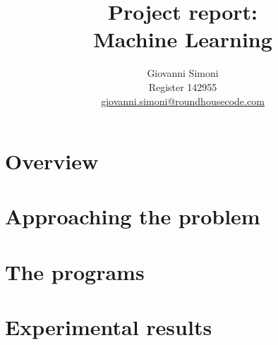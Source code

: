 \documentclass[10pt,a4paper]{paper}
\title {
    Project report:\\
    Machine Learning
}
\author{
    Giovanni Simoni\\
    Register 142955\\
    \href{mailto:giovanni.simoni@roundhousecode.com}
         {giovanni.simoni@roundhousecode.com}
}
\begin{document}
    \maketitle

    \tableofcontents

    \newpage
    \section{ Overview } \label{sec:Overview}
    

    \section{ Approaching the problem } \label{sec:Approaching-the-problem}
    

    \section{ The programs } \label{sec:Programs}
    

    \section{ Experimental results } \label{sec:Experimental-results}
    
\end{document}
